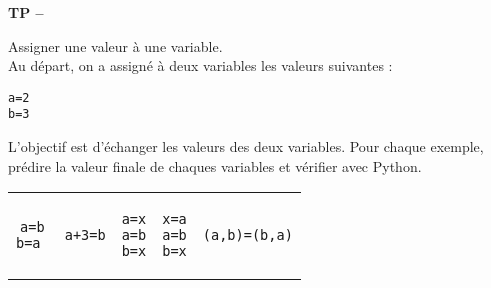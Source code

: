 






\begin{center}
{\Large\bf TP \no {\numero} -- \descrip}
\end{center}




\begin{exercice}Assigner une valeur \` a une variable.\\
Au départ, on a assigné à deux variables les valeurs suivantes :
\begin{verbatim}
a=2
b=3
\end{verbatim}
L'objectif est d'échanger les valeurs des deux variables. Pour chaque exemple, pr\' edire la valeur finale de chaques variables et v\' erifier avec Python.
\begin{center}
\begin{tabular}{c|c|c|c|c}
\begin{minipage}{2.5cm}
\begin{verbatim}
a=b
b=a 
\end{verbatim}
\end{minipage}
&
\begin{minipage}{2.5cm}
\begin{verbatim}
a+3=b
\end{verbatim}
\end{minipage}
&
\begin{minipage}{2.5cm}
\begin{verbatim}
a=x
a=b
b=x
\end{verbatim}
\end{minipage}
&
\begin{minipage}{2.5cm}
\begin{verbatim}
x=a
a=b
b=x
\end{verbatim}
\end{minipage}
&
\begin{minipage}{2.5cm}
\begin{verbatim}
(a,b)=(b,a)
\end{verbatim}
\end{minipage}
\end{tabular}
\end{center}
\end{exercice}
\bigskip
 


